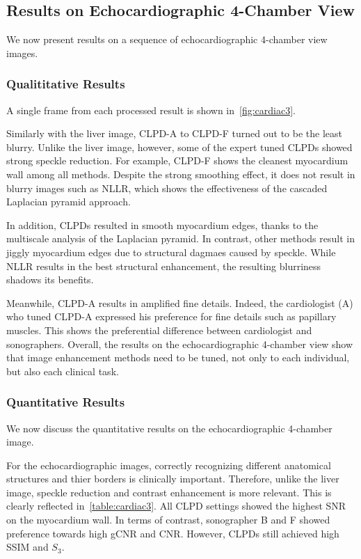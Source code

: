 \subsection{Results on Echocardiographic 4-Chamber View}
We now present results on a sequence of echocardiographic 4-chamber view images.

\subsubsection{Qualititative Results}
A single frame from each processed result is shown in~\cref{fig:cardiac3}.

Similarly with the liver image, CLPD-A to CLPD-F turned out to be the least blurry.
Unlike the liver image, however, some of the expert tuned CLPDs showed strong speckle reduction.
For example, CLPD-F shows the cleanest myocardium wall among all methods.
Despite the strong smoothing effect, it does not result in blurry images such as NLLR, which shows the effectiveness of the cascaded Laplacian pyramid approach.

In addition, CLPDs resulted in smooth myocardium edges, thanks to the multiscale analysis of the Laplacian pyramid.
In contrast, other methods result in jiggly myocardium edges due to structural dagmaes caused by speckle.
While NLLR results in the best structural enhancement, the resulting blurriness shadows its benefits.

Meanwhile, CLPD-A results in amplified fine details.
Indeed, the cardiologist (A) who tuned CLPD-A expressed his preference for fine details such as papillary muscles.
This shows the preferential difference between cardiologist and sonographers.
Overall, the results on the echocardiographic 4-chamber view show that image enhancement methods need to be tuned, not only to each individual, but also each clinical task.

\subsubsection{Quantitative Results}
We now discuss the quantitative results on the echocardiographic 4-chamber image.

For the echocardiographic images, correctly recognizing different anatomical structures and thier borders is clinically important.
Therefore, unlike the liver image, speckle reduction and contrast enhancement is more relevant.
This is clearly reflected in~\cref{table:cardiac3}.
All CLPD settings showed the highest SNR on the myocardium wall.
In terms of contrast, sonographer B and F showed preference towards high gCNR and CNR.
However, CLPDs still achieved high SSIM and \(S_3\).


